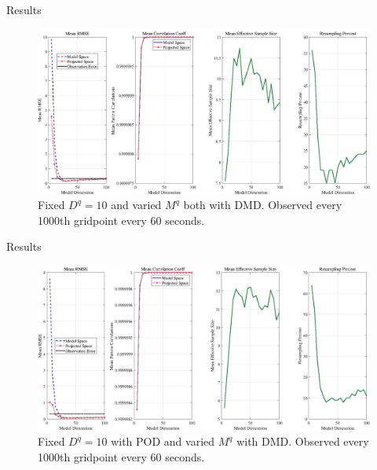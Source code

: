 \documentclass[aspectratio=169]{beamer}
\begin{document}
\begin{frame}{Results}
\vfill
    \begin{figure}[H]
        \centering
        \includegraphics[width=.9\textwidth]{figures/SWE_physical_proj_DMD_inth1000.png}
        \caption{Fixed $D^q = 10$ and varied $M^q$ both with DMD.  Observed every 1000th gridpoint every 60 seconds.}
    \end{figure}
\vfill
\end{frame}


\begin{frame}{Results}
\vfill
    \begin{figure}[H]
        \centering
        \includegraphics[width=.9\textwidth]{figures/SWE_physical_proj_DMDPOD_inth1000.png}
        \caption{Fixed $D^q = 10$ with POD and varied $M^q$ with DMD.  Observed every 1000th gridpoint every 60 seconds.}
    \end{figure}
\vfill
\end{frame}

\end{document}
